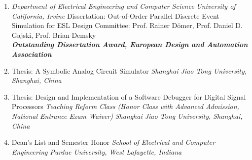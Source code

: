 

%
%



\begin{enumerate}[ ]
\item 
	{\textit{Department of Electrical Engineering and Computer Science}}{ }
	{\textit{University of California, Irvine}} { }
	{Dissertation: Out-of-Order Parallel Discrete Event Simulation for ESL Design}{}
	{Committee: Prof. Rainer D\"{o}mer, Prof. Daniel D. Gajski, Prof. Brian Demsky \\} {}
	{\textit{\bf Outstanding Dissertation Award, European Design and Automation Association}}

\item
	{Thesis: A Symbolic Analog Circuit Simulator}{ }
	{\textit{Shanghai Jiao Tong University, Shanghai, China}}{ }

\item
	{Thesis: Design and Implementation of a Software Debugger for Digital Signal Processors}{} 
	{\textit{Teaching Reform Class (Honor Class with Advanced Admission, National Entrance Exam Waiver)}}{}
	{\textit{Shanghai Jiao Tong University, Shanghai, China}}{}
	
\item
	{Dean's List and Semester Honor}{}
	{\textit{School of Electrical and Computer Engineering}}{}
	{\textit{Purdue University, West Lafayette, Indiana}}{}

		
\end{enumerate}
